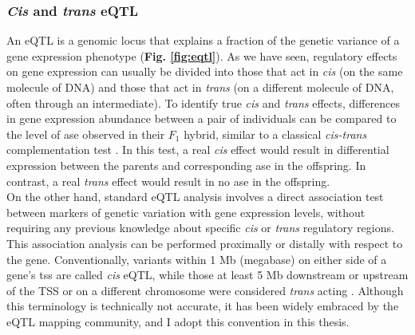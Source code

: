 \subsubsection{\textit{Cis} and \textit{trans} eQTL}

An eQTL is a genomic locus that explains a fraction of the genetic variance of a gene expression phenotype (\textbf{Fig. \ref{fig:eqtl}}). 
As we have seen, regulatory effects on gene expression can usually be divided into those that act in \textit{cis} (on the same molecule of DNA) and those that act in \textit{trans} (on a different molecule of DNA, often through an intermediate).
To identify true \textit{cis} and \textit{trans} effects, differences in gene expression abundance between a pair of individuals can be compared to the level of \gls{ase} observed in their $F_1$ hybrid, similar to a classical \textit{cis-trans} complementation test \cite{mcmanus2010regulatory, goncalves2012extensive}. 
In this test, a real \textit{cis} effect would result in differential expression between the parents and corresponding \gls{ase} in the offspring. 
In contrast, a real \textit{trans} effect would result in no \gls{ase} in the offspring. \\

On the other hand, standard eQTL analysis involves a direct association test between markers of genetic variation with gene expression levels, without requiring any previous knowledge about specific \textit{cis} or \textit{trans} regulatory regions. 
This association analysis can be performed proximally or distally with respect to the gene. 
Conventionally, variants within 1 Mb (megabase) on either side of a gene's \gls{tss} are called \textit{cis} eQTL, while those at least 5 Mb downstream or upstream of the TSS or on a different chromosome were considered \textit{trans} acting \cite{nica2013expression, westra2014genome}.
Although this terminology is technically not accurate, it has been widely embraced by the eQTL mapping community, and I adopt this convention in this thesis. 


